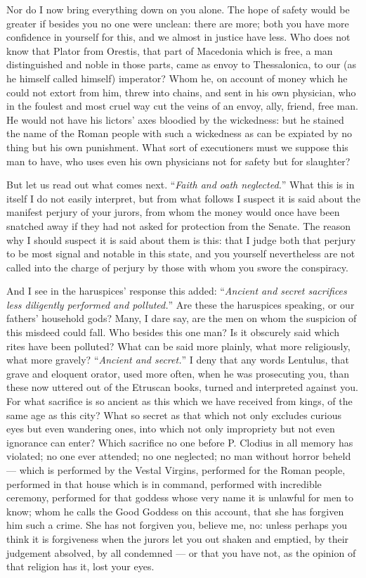  Nor do I now bring everything down on you alone. The hope of safety would be greater if besides you no one were unclean: there are more; both you have more confidence in yourself for this, and we almost in justice have less. Who does not know that Plator from Orestis, that part of Macedonia which is free, a man distinguished and noble in those parts, came as envoy to Thessalonica, to our (as he himself called himself) imperator? Whom he, on account of money which he could not extort from him, threw into chains, and sent in his own physician, who in the foulest and most cruel way cut the veins of an envoy, ally, friend, free man. He would not have his lictors' axes bloodied by the wickedness: but he stained the name of the Roman people with such a wickedness as can be expiated by no thing but his own punishment. What sort of executioners must we suppose this man to have, who uses even his own physicians not for safety but for slaughter?

 But let us read out what comes next. ``\textit{Faith and oath neglected.}'' What this is in itself I do not easily interpret, but from what follows I suspect it is said about the manifest perjury of your jurors, from whom the money would once have been snatched away if they had not asked for protection from the Senate. The reason why I should suspect it is said about them is this: that I judge both that perjury to be most signal and notable in this state, and you yourself nevertheless are not called into the charge of perjury by those with whom you swore the conspiracy.

 And I see in the haruspices' response this added: ``\textit{Ancient and secret sacrifices less diligently performed and polluted.}'' Are these the haruspices speaking, or our fathers' household gods? Many, I dare say, are the men on whom the suspicion of this misdeed could fall. Who besides this one man? Is it obscurely said which rites have been polluted? What can be said more plainly, what more religiously, what more gravely? ``\textit{Ancient and secret.}'' I deny that any words Lentulus, that grave and eloquent orator, used more often, when he was prosecuting you, than these now uttered out of the Etruscan books, turned and interpreted against you. For what sacrifice is so ancient as this which we have received from kings, of the same age as this city? What so secret as that which not only excludes curious eyes but even wandering ones, into which not only impropriety but not even ignorance can enter? Which sacrifice no one before P. Clodius in all memory has violated; no one ever attended; no one neglected; no man without horror beheld --- which is performed by the Vestal Virgins, performed for the Roman people, performed in that house which is in command, performed with incredible ceremony, performed for that goddess whose very name it is unlawful for men to know; whom he calls the Good Goddess on this account, that she has forgiven him such a crime. She has not forgiven you, believe me, no: unless perhaps you think it is forgiveness when the jurors let you out shaken and emptied, by their judgement absolved, by all condemned --- or that you have not, as the opinion of that religion has it, lost your eyes.

